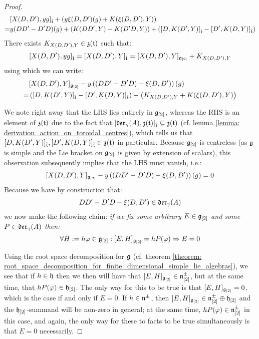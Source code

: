 \begin{proof}
                    $$
                        \begin{aligned}
                            & [ X(D, D') , y g ]_{\hat{\mathfrak{t}}} + \left( y \xi(D, D')(g) + K(\xi(D, D'), Y) \right)
                            \\
                            = & y (DD' - D'D)( g ) + ( K(DD', Y) - K(D'D, Y) ) + ( [ D, K(D', Y) ]_{\hat{\mathfrak{t}}} - [ D', K(D, Y) ]_{\hat{\mathfrak{t}}} )
                        \end{aligned}
                    $$
                There exists $K_{X(D, D'), Y} \in \mathfrak{z}(\mathfrak{t})$ such that:
                    $$[ X(D, D') , y g ]_{\hat{\mathfrak{t}}} = [ X(D, D') , Y ]_{\hat{\mathfrak{t}}} = [X(D, D'), Y]_{\mathfrak{g}_{[2]}} + K_{X(D, D'), Y}$$
                using which we can write:
                    $$
                        \begin{aligned}
                            & [X(D, D'), Y]_{\mathfrak{g}_{[2]}} - y \left( ( DD' - D'D) - \xi(D, D') \right)( g )
                            \\
                            = & \left( [ D, K(D', Y) ]_{\hat{\mathfrak{t}}} - [ D', K(D, Y) ]_{\hat{\mathfrak{t}}} \right) - \left( K_{X(D, D'), Y} + K(\xi(D, D'), Y) \right)
                        \end{aligned}
                    $$
                    
                We note right away that the LHS lies entirely in $\mathfrak{g}_{[2]}$, whereas the RHS is an element of $\mathfrak{z}(\mathfrak{t})$ due to the fact that $[\mathfrak{der}_{\gamma}(A), \mathfrak{z}(\mathfrak{t})]_{\hat{\mathfrak{t}}} \subseteq \mathfrak{z}(\mathfrak{t})$ (cf. lemma \ref{lemma: derivation_action_on_toroidal_centres}), which tells us that $[ D, K(D', Y) ]_{\hat{\mathfrak{t}}}, [ D', K(D, Y) ]_{\hat{\mathfrak{t}}} \in \mathfrak{z}(\mathfrak{t})$ in particular. Because $\mathfrak{g}_{[2]}$ is centreless (as $\mathfrak{g}$ is simple and the Lie bracket on $\mathfrak{g}_{[2]}$ is given by extension of scalars), this observation subsequently implies that the LHS must vanish, i.e.:
                    $$[X(D, D'), Y]_{\mathfrak{g}_{[2]}} - y \left( ( DD' - D'D) - \xi(D, D') \right)( g ) = 0$$
                Because we have by construction that:
                    $$DD' - D'D - \xi(D, D') \in \mathfrak{der}_{\gamma}(A)$$
                we now make the following claim: \textit{if we fix some arbitrary $E \in \mathfrak{g}_{[2]}$ and some $P \in \mathfrak{der}_{\gamma}(A)$ then:}
                    $$\forall H := h \varphi \in \mathfrak{g}_{[2]}: [E, H]_{\mathfrak{g}_{[2]}} = h P( \varphi ) \Rightarrow E = 0$$

                Using the root space decomposition for $\mathfrak{g}$ (cf. theorem \ref{theorem: root_space_decomposition_for_finite_dimensional_simple_lie_algebras}), we see that if $h \in \mathfrak{h}$ then we then will have that $[E, H]_{\mathfrak{g}_{[2]}} \in \mathfrak{n}^{\pm}_{[2]}$, but at the same time, that $h P(\varphi) \in \mathfrak{h}_{[2]}$. The only way for this to be true is that $[E, H]_{\mathfrak{g}_{[2]}} = 0$, which is the case if and only if $E = 0$. If $h \in \mathfrak{n}^{\pm}$, then $[E, H]_{\mathfrak{g}_{[2]}} \in \mathfrak{n}^{\pm}_{[2]} \oplus \mathfrak{h}_{[2]}$ and the $\mathfrak{h}_{[2]}$-summand will be non-zero in general; at the same time, $h P(\varphi) \in \mathfrak{n}^{\pm}_{[2]}$ in this case, and again, the only way for these to facts to be true simultaneously is that $E = 0$ necessarily. 


\end{proof}
